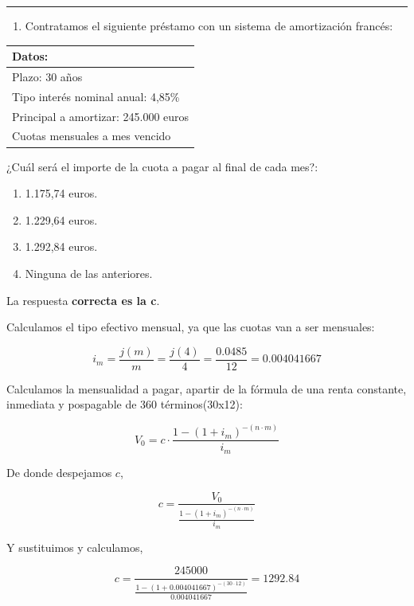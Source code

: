 \documentclass[
  letterpaper,
  DIV=11,
  numbers=noendperiod]{scrreprt}
\providecommand{\tightlist}{%
  \setlength{\itemsep}{0pt}\setlength{\parskip}{0pt}}\usepackage{longtable,booktabs,array}
\begin{document}
\begin{center}\rule{0.5\linewidth}{0.5pt}\end{center}

\begin{enumerate}
\def\labelenumi{\arabic{enumi}.}
\setcounter{enumi}{54}
\tightlist
\item
  Contratamos el siguiente préstamo con un sistema de amortización
  francés:
\end{enumerate}

\begin{longtable}[]{@{}l@{}}
\toprule()
\textbf{Datos:} \\
\midrule()
\endhead
Plazo: 30 años \\
Tipo interés nominal anual: 4,85\% \\
Principal a amortizar: 245.000 euros \\
Cuotas mensuales a mes vencido \\
\bottomrule()
\end{longtable}

¿Cuál será el importe de la cuota a pagar al final de cada mes?:

\begin{enumerate}
\def\labelenumi{\alph{enumi})}
\item
  1.175,74 euros.
\item
  1.229,64 euros.
\item
  1.292,84 euros.
\item
  Ninguna de las anteriores.
\end{enumerate}

\begin{tcolorbox}[enhanced jigsaw, left=2mm, opacityback=0, colback=white, breakable, arc=.35mm, bottomrule=.15mm, rightrule=.15mm, toprule=.15mm, leftrule=.75mm, colframe=quarto-callout-tip-color-frame]
\begin{minipage}[t]{5.5mm}
\textcolor{quarto-callout-tip-color}{\faLightbulb}
\end{minipage}%
\begin{minipage}[t]{\textwidth - 5.5mm}

La respuesta \textbf{correcta es la c}.

Calculamos el tipo efectivo mensual, ya que las cuotas van a ser
mensuales:

\[i_m=\frac{j\left(m\right)}{m}=\frac{j\left(4\right)}{4}=\frac{0.0485}{12}=0.004041667\]

Calculamos la mensualidad a pagar, apartir de la fórmula de una renta
constante, inmediata y pospagable de 360 términos(30x12):

\[V_0=c\cdot\frac{1-\left(1+i_m\right)^{-(n\cdot m)}}{i_m}\]

De donde despejamos \(c\),

\[c=\frac{V_0 }{\frac{1-\left(1+i_m\right)^{-(n\cdot m)}}{i_m} }\]

Y sustituimos y calculamos,

\[c=\frac{245000 }{\frac{1-\left(1+0.004041667\right)^{-(30\cdot 12)}}{0.004041667} }=1292.84\]

\end{minipage}%
\end{tcolorbox}
\end{document}
